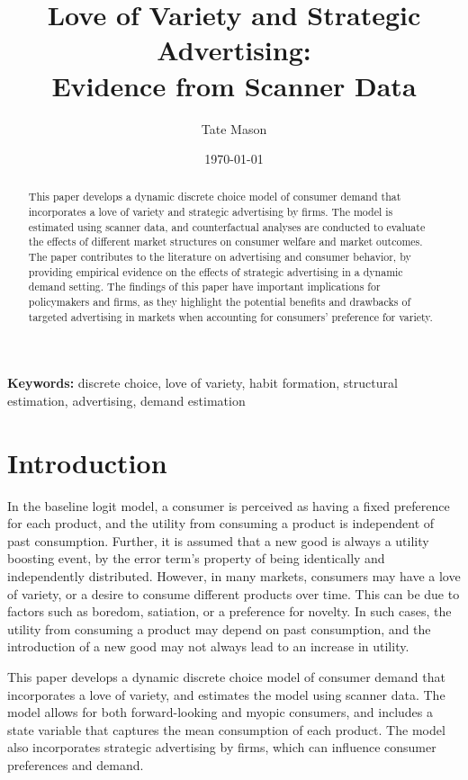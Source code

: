 \documentclass[12pt]{article}
\title{\textbf{Love of Variety and Strategic Advertising:\\
               Evidence from Scanner Data}}
\author[1]{Tate Mason}
\affil[1]{John Munro Godfrey Sr. Department of Economics, University of Georgia}
\date{\today}
\begin{document}
\maketitle

\begin{abstract}
This paper develops a dynamic discrete choice model of consumer demand that incorporates a love of variety and strategic advertising by firms. The model is estimated using scanner data, and counterfactual analyses are conducted to evaluate the effects of different market structures on consumer welfare and market outcomes. The paper contributes to the literature on advertising and consumer behavior, by providing empirical evidence on the effects of strategic advertising in a dynamic demand setting. The findings of this paper have important implications for policymakers and firms, as they highlight the potential benefits and drawbacks of targeted advertising in markets when accounting for consumers' preference for variety.
\end{abstract}

\noindent\textbf{Keywords:} discrete choice, love of variety, habit formation,
                             structural estimation, advertising, demand estimation

\newpage

\section{Introduction}

In the baseline logit model, a consumer is perceived as having a fixed preference for each product, and the utility from consuming a product is independent of past consumption. Further, it is assumed that a new good is always a utility boosting event, by the error term's property of being identically and independently distributed. However, in many markets, consumers may have a love of variety, or a desire to consume different products over time. This can be due to factors such as boredom, satiation, or a preference for novelty. In such cases, the utility from consuming a product may depend on past consumption, and the introduction of a new good may not always lead to an increase in utility.

This paper develops a dynamic discrete choice model of consumer demand that incorporates a love of variety, and estimates the model using scanner data. The model allows for both forward-looking and myopic consumers, and includes a state variable that captures the mean consumption of each product. The model also incorporates strategic advertising by firms, which can influence consumer preferences and demand.
\end{document}
